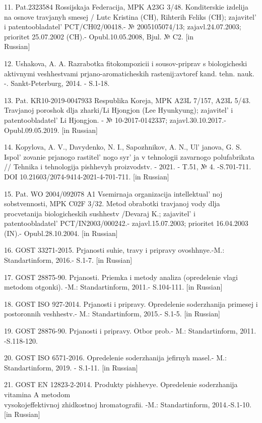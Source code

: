 \begin{references}
11. Pat.2323584 Rossijskaja Federacija, MPK A23G 3/48. Konditerskie
izdelija na osnove travjanyh smesej / Lutc Kristina (CH), Rihterih
Feliks (CH); zajavitel'{} i
patentoobladatel'{} PCT/CH02/00418.- № 2005105074/13;
zajavl.24.07.2003; prioritet 25.07.2002 (CH).- Opubl.10.05.2008, Bjul.
№ C2. {[}in \\Russian{]}

12. Ushakova, A. A. Razrabotka fitokompozicii i sousov-priprav s
biologicheski aktivnymi veshhestvami prjano-aromaticheskih
rastenij:avtoref kand. tehn. nauk. -. Sankt-Peterburg, 2014. - S.1-18.

13. Pat. KR10-2019-0047933 Respublika Koreja, MPK A23L 7/157, A23L 5/43.
Travjanoj poroshok dlja zharki/Li Hjongjon (Lee Hyunkyung);
zajavitel'{} i patentoobladatel'{} Li
Hjongjon. - № 10-2017-0142337; zajavl.30.10.2017.- Opubl.09.05.2019.
{[}in Russian{]}

14. Kopylova, A. V., Davydenko, N. I., Sapozhnikov, A. N.,
Ul' janova, G. S. Ispol' zovanie prjanogo
rastitel' nogo syr' ja v tehnologii
zavarnogo polufabrikata // Tehnika i tehnologija pishhevyh proizvodstv.
- 2021. - T.51, № 4. -S.701-711. DOI
10.21603/2074-9414-2021-4-701-711. {[}in Russian{]}

15. Pat. WO 2004/092078 A1 Vsemirnaja organizacija
intellektual' noj sobstvennosti, MPK C02F 3/32. Metod
obrabotki travjanoj vody dlja procvetanija biologicheskih sushhestv
/Devaraj K.; zajavitel'{} i\\
patentoobladatel'{} PCT/IN2003/000242.-
zajavl.15.07.2003; prioritet 16.04.2003 (IN).- Opubl.28.10.2004. {[}in
Russian{]}

16. GOST 33271-2015. Prjanosti suhie, travy i pripravy ovoshhnye.-M.:
Standartinform, 2016.- S.1-7. {[}in Russian{]}

17. GOST 28875-90. Prjanosti. Priemka i metody analiza (opredelenie vlagi
metodom otgonki). -M.: Standartinform, 2011.- S.104-111. {[}in
Russian{]}

18. GOST ISO 927-2014. Prjanosti i pripravy. Opredelenie soderzhanija
primesej i postoronnih veshhestv.- M.: Standartinform, 2015.- S.1-5.
{[}in Russian{]}

19. GOST 28876-90. Prjanosti i pripravy. Otbor prob.- M.: Standartinform,
2011. -S.118-120.

20. GOST ISO 6571-2016. Opredelenie soderzhanija jefirnyh masel.- M.:
Standartinform, 2019. - S.1-11. {[}in Russian{]}

21. GOST EN 12823-2-2014. Produkty pishhevye. Opredelenie soderzhanija
vitamina A metodom \\vysokojeffektivnoj zhidkostnoj hromatografii. -M.:
Standartinform, 2014.-S.1-10. {[}in Russian{]}


\end{references}
